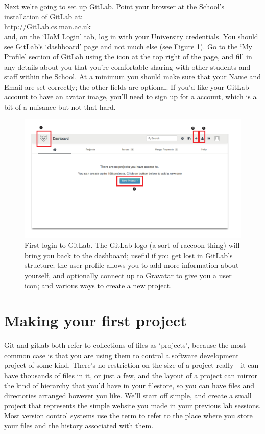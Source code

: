 Next we're going to set up GitLab. Point your browser at the School's installation of GitLab at:
\\
\url{http://GitLab.cs.man.ac.uk}
\\
and, on the `UoM Login' tab, log in with your University credentials. You should see GitLab's `dashboard' page and not much else (see Figure \ref{figure:GitLab-first-login}). Go to the `My Profile' section of GitLab using the icon at the top right of the page, and fill in any details about you that you're comfortable sharing with other students and staff within the School. At a minimum you should make sure that your Name and Email are set correctly; the other fields are optional. If you'd like your GitLab account to have an avatar image, you'll need to sign up for a  account, which is a bit of a nuisance but not that hard.

\begin{figure}
\centerline{\includegraphics[width=15cm]{images/GitLab-first-login}}
\caption{First login to GitLab. \protect{} The GitLab logo (a sort of raccoon thing) will bring you back to the dashboard; useful if you get lost in GitLab's structure; \protect{} the user-profile allows you to add more information about yourself, and optionally connect up to Gravatar to give you a user icon; and \protect{} various ways to create a new project.}\label{figure:GitLab-first-login}
\end{figure}

\section{Making your first project}

Git and gitlab both refer to collections of files as `projects', because the most common case is that you are using them to control a software development project of some kind. There's no restriction on the size of a project really---it can have thousands of files in it, or just a few, and the layout of a project can mirror the kind of hierarchy that you'd have in your filestore, so you can have files and directories arranged however you like. We'll start off simple, and create a small project that represents the simple website you made in your previous lab sessions. Most version control systems use the term  to refer to the place where you store your files and the history associated with them. 

